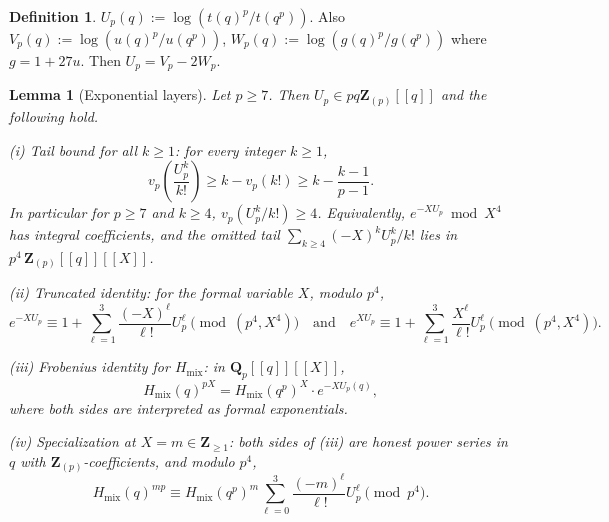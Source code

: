\documentclass[11pt]{amsart}
\newtheorem{lemma}[theorem]{Lemma}
\theoremstyle{definition}
\newtheorem{definition}[theorem]{Definition}
\theoremstyle{remark}
\newcommand{\Q}{\mathbf{Q}}
\newcommand{\Z}{\mathbf{Z}}
\begin{document}
\begin{definition}\label{def:Up}
$U_p(q):=\log(t(q)^p/t(q^p))$. Also $V_p(q):=\log(u(q)^p/u(q^p))$, $W_p(q):=\log(g(q)^p/g(q^p))$ where $g=1+27u$. Then $U_p=V_p-2W_p$.
\end{definition}

\begin{lemma}[Exponential layers]\label{lem:exp-layers}
Let $p\ge 7$. Then $U_p\in pq\Z_{(p)}[[q]]$ and the following hold.

\emph{(i) Tail bound for all $k\ge 1$:} for every integer $k\ge 1$,
\[
v_p\!\left(\frac{U_p^k}{k!}\right)\ge k-v_p(k!)\ge k-\frac{k-1}{p-1}.
\]
In particular for $p\ge 7$ and $k\ge 4$, $v_p(U_p^k/k!)\ge 4$. Equivalently, $e^{-XU_p}\bmod X^4$ has integral coefficients, and the omitted tail $\sum_{k\ge 4}(-X)^kU_p^k/k!$ lies in $p^4\,\Z_{(p)}[[q]][[X]]$.

\emph{(ii) Truncated identity:} for the formal variable $X$, modulo $p^4$,
\[
e^{-XU_p}\equiv 1+\sum_{\ell=1}^3\frac{(-X)^\ell}{\ell!}U_p^\ell\pmod{(p^4,X^4)}\quad\text{and}\quad e^{XU_p}\equiv 1+\sum_{\ell=1}^3\frac{X^\ell}{\ell!}U_p^\ell\pmod{(p^4,X^4)}.
\]

\emph{(iii) Frobenius identity for $H_{\mathrm{mix}}$:} in $\Q_p[[q]][[X]]$,
\[
H_{\mathrm{mix}}(q)^{pX}=H_{\mathrm{mix}}(q^p)^X\cdot e^{-XU_p(q)},
\]
where both sides are interpreted as formal exponentials.

\emph{(iv) Specialization at $X=m\in\Z_{\ge 1}$:} both sides of (iii) are honest power series in $q$ with $\Z_{(p)}$-coefficients, and modulo $p^4$,
\[
H_{\mathrm{mix}}(q)^{mp}\equiv H_{\mathrm{mix}}(q^p)^m\sum_{\ell=0}^3\frac{(-m)^\ell}{\ell!}U_p^\ell\pmod{p^4}.
\]
\end{lemma}
\end{document}

